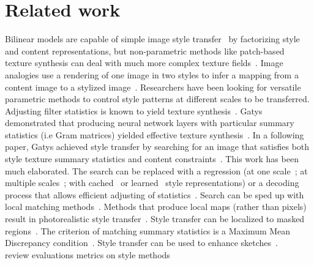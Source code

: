 \documentclass[runningheads]{llncs}
\begin{document}
\section{Related work} \label{sec:gatys}
Bilinear models are capable of simple image style transfer~\cite{Tenenbaum2000} by factorizing style and content representations, but non-parametric methods like patch-based texture synthesis can deal with much more complex texture fields~\cite{Efros2001}.  Image analogies
use a rendering of one image in two styles to infer a mapping from a content image to a stylized
image~\cite{Hertzmann2001}. Researchers have been looking for versatile parametric methods to control style patterns at
different scales to be transferred. Adjusting filter statistics is known to yield texture
synthesis~\cite{debonet,simoncelli}.  Gatys \ea demonstrated that producing neural network layers with particular
summary statistics (i.e Gram matrices) yielded effective texture synthesis~\cite{NIPS2015_5633}. In a following paper,
Gatys \ea achieved style transfer by searching for an image that satisfies both style texture summary statistics and
content constraints~\cite{gatys2016image}. This work has been much elaborated. The search can be replaced with a
regression (at one scale~\cite{Johnson2016Perceptual}; at multiple scales~\cite{wang2016multimodal}; with
cached~\cite{chen2017stylebank} or learned~\cite{dumoulin2016learned} style representations) or a decoding process that
allows efficient adjusting of statistics~\cite{UST,li2018closed}. Search can be sped up with local matching
methods~\cite{chen2016fast}. Methods that produce local maps (rather than pixels) result in photorealistic style
transfer~\cite{Shih2014,Luan2017}. Style transfer can be localized to masked regions~\cite{gatys2016controlling}. The
criterion of matching summary statistics is a Maximum Mean Discrepancy condition~\cite{li2017demystifying}. Style
transfer can be used to enhance sketches~\cite{champandard2016semantic}.  \\

\todo review evaluations metrics on style methods\\
\end{document}
